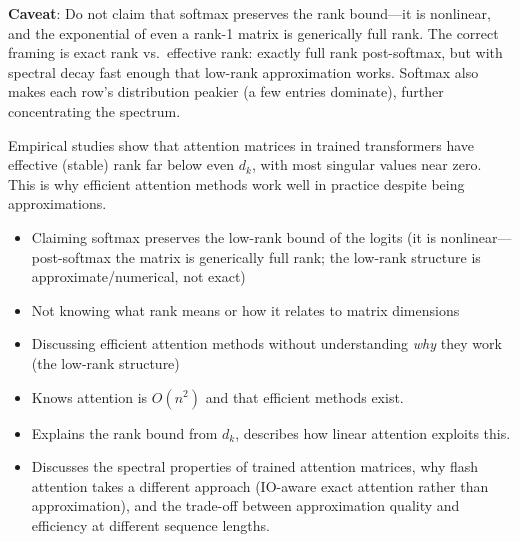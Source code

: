 \begin{interviewq}
\textbf{Caveat}: Do not claim that softmax preserves the rank bound---it is nonlinear, and the exponential of even a rank-1 matrix is generically full rank. The correct framing is exact rank vs.\ effective rank: exactly full rank post-softmax, but with spectral decay fast enough that low-rank approximation works. Softmax also makes each row's distribution peakier (a few entries dominate), further concentrating the spectrum.

Empirical studies show that attention matrices in trained transformers have effective (stable) rank far below even $d_k$, with most singular values near zero. This is why efficient attention methods work well in practice despite being approximations.

\redflags
\begin{itemize}
    \item Claiming softmax preserves the low-rank bound of the logits (it is nonlinear---post-softmax the matrix is generically full rank; the low-rank structure is approximate/numerical, not exact)
    \item Not knowing what rank means or how it relates to matrix dimensions
    \item Discussing efficient attention methods without understanding \textit{why} they work (the low-rank structure)
\end{itemize}


\goodgreat
\begin{itemize}
    \item {} Knows attention is $O(n^2)$ and that efficient methods exist.
    \item {} Explains the rank bound from $d_k$, describes how linear attention exploits this.
    \item {} Discusses the spectral properties of trained attention matrices, why flash attention takes a different approach (IO-aware exact attention rather than approximation), and the trade-off between approximation quality and efficiency at different sequence lengths.
\end{itemize}

\end{interviewq}

